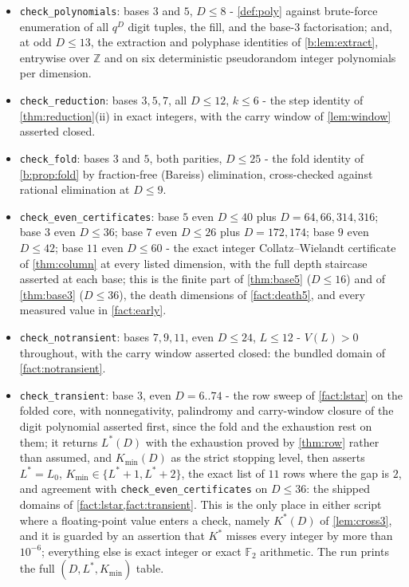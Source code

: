 \documentclass[11pt]{amsart}
\theoremstyle{definition}
\theoremstyle{remark}
\begin{document}
\begin{itemize}
\item \texttt{check\_polynomials}: bases $3$ and $5$, $D \le 8$ - \cref{def:poly} against brute-force enumeration of all $q^D$ digit tuples, the fill, and the base-$3$ factorisation; and, at odd $D \le 13$, the extraction and polyphase identities of \cref{b:lem:extract}, entrywise over $\mathbb{Z}$ and on six deterministic pseudorandom integer polynomials per dimension.
\item \texttt{check\_reduction}: bases $3, 5, 7$, all $D \le 12$, $k \le 6$ - the step identity of \cref{thm:reduction}(ii) in exact integers, with the carry window of \cref{lem:window} asserted closed.
\item \texttt{check\_fold}: bases $3$ and $5$, both parities, $D \le 25$ - the fold identity of \cref{b:prop:fold} by fraction-free (Bareiss) elimination, cross-checked against rational elimination at $D \le 9$.
\item \texttt{check\_even\_certificates}: base $5$ even $D \le 40$ plus $D = 64, 66, 314, 316$; base $3$ even $D \le 36$; base $7$ even $D \le 26$ plus $D = 172, 174$; base $9$ even $D \le 42$; base $11$ even $D \le 60$ - the exact integer Collatz--Wielandt certificate of \cref{thm:column} at every listed dimension, with the full depth staircase asserted at each base; this is the finite part of \cref{thm:base5} ($D \le 16$) and of \cref{thm:base3} ($D \le 36$), the death dimensions of \cref{fact:death5}, and every measured value in \cref{fact:early}.
\item \texttt{check\_notransient}: bases $7, 9, 11$, even $D \le 24$, $L \le 12$ - $V(L) > 0$ throughout, with the carry window asserted closed: the bundled domain of \cref{fact:notransient}.
\item \texttt{check\_transient}: base $3$, even $D = 6..74$ - the row sweep of \cref{fact:lstar} on the folded core, with nonnegativity, palindromy and carry-window closure of the digit polynomial asserted first, since the fold and the exhaustion rest on them; it returns $L^{*}(D)$ with the exhaustion proved by \cref{thm:row} rather than assumed, and $K_{\min}(D)$ as the strict stopping level, then asserts $L^{*} = L_0$, $K_{\min} \in \{L^{*}+1, L^{*}+2\}$, the exact list of $11$ rows where the gap is $2$, and agreement with \texttt{check\_even\_certificates} on $D \le 36$: the shipped domains of \cref{fact:lstar,fact:transient}. This is the only place in either script where a floating-point value enters a check, namely $K^{*}(D)$ of \cref{lem:cross3}, and it is guarded by an assertion that $K^{*}$ misses every integer by more than $10^{-6}$; everything else is exact integer or exact $\mathbb{F}_2$ arithmetic. The run prints the full $(D, L^{*}, K_{\min})$ table.

\end{itemize}
\end{document}
